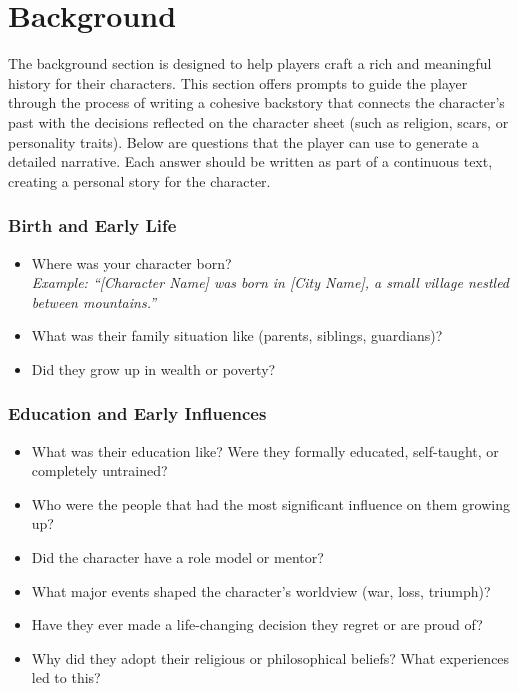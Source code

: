 \documentclass[12pt]{book}  %
\begin{document}
\chapter{Background}

The background section is designed to help players craft a rich and meaningful history for their characters. This section offers prompts to guide the player through the process of writing a cohesive backstory that connects the character's past with the decisions reflected on the character sheet (such as religion, scars, or personality traits). Below are questions that the player can use to generate a detailed narrative. Each answer should be written as part of a continuous text, creating a personal story for the character.

\subsection*{Birth and Early Life}

\begin{itemize}
    \item Where was your character born? \\
    \textit{Example: ``[Character Name] was born in [City Name], a small village nestled between mountains.''}
    
    \item What was their family situation like (parents, siblings, guardians)?
    \item Did they grow up in wealth or poverty?
\end{itemize}

\subsection*{Education and Early Influences}

\begin{itemize}
    \item What was their education like? Were they formally educated, self-taught, or completely untrained?
    \item Who were the people that had the most significant influence on them growing up?
    \item Did the character have a role model or mentor?
    \item What major events shaped the character’s worldview (war, loss, triumph)?
    \item Have they ever made a life-changing decision they regret or are proud of?
    \item Why did they adopt their religious or philosophical beliefs? What experiences led to this?
\end{itemize}
\end{document}
